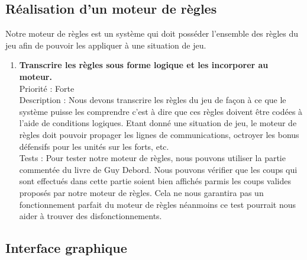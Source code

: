 \documentclass[12pt]{article}
\begin{document}
		\subsection{Réalisation d'un moteur de règles}

			Notre moteur de règles est un système qui doit posséder l'ensemble des règles du jeu afin de pouvoir les appliquer à une situation de jeu.

			\begin{enumerate}

				\item \textbf{Transcrire les règles sous forme logique et les incorporer au moteur.} 
				\\[0.7\baselineskip]
				Priorité : Forte 
				\\[0.7\baselineskip]
				Description : Nous devons transcrire les règles du jeu de façon à ce que le système puisse les comprendre c'est à dire que ces 
				règles doivent être codées à l'aide de conditions logiques. Etant donné une situation de jeu, le moteur de règles doit pouvoir 
				propager les lignes de communications, octroyer les bonus défensifs pour les unités sur les forts, etc.
				\\[0.7\baselineskip]
				Tests : Pour tester notre moteur de règles, nous pouvons utiliser la partie commentée du livre de Guy Debord. Nous pouvons 
				vérifier que les coups qui sont effectués dans cette partie soient bien affichés parmis les coups valides proposés par notre 
				moteur de règles. Cela ne nous garantira pas un fonctionnement parfait du moteur de règles néanmoins ce test pourrait nous 
				aider à trouver des disfonctionnements. 
				\\[0.7\baselineskip]
				
			\end{enumerate}

		\subsection{Interface graphique}
\end{document}
